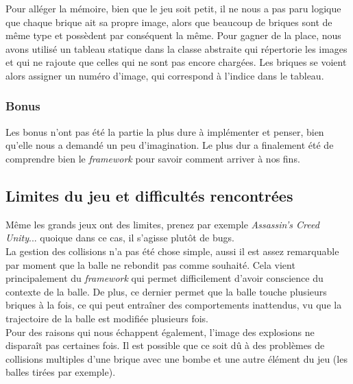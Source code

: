 \documentclass[a4paper,10pt]{article}
\begin{document}
        Pour alléger la mémoire, bien que le jeu soit petit, il ne nous a pas paru logique que chaque brique ait
        sa propre image, alors que beaucoup de briques sont de même type et possèdent par conséquent la même.
        Pour gagner de la place, nous avons utilisé un tableau
        statique dans la classe abstraite qui répertorie les images et qui ne rajoute que celles qui ne sont pas
        encore chargées. Les briques se voient alors assigner un numéro d'image, qui correspond à l'indice dans le
        tableau.

    \subsubsection{Bonus}
        Les bonus n'ont pas été la partie la plus dure à implémenter et penser, bien qu'elle nous a demandé un peu
        d'imagination. Le plus dur a finalement été de comprendre bien le \textit{framework} pour savoir
        comment arriver à nos fins.


\subsection{Limites du jeu et difficultés rencontrées}


Même les grands jeux ont des limites, prenez par exemple \textit{Assassin's Creed Unity}... quoique dans ce cas,
il s'agisse plutôt de bugs. \\

La gestion des collisions n'a pas été chose simple, aussi il est assez remarquable par moment que la balle
ne rebondit pas comme souhaité. Cela vient principalement du \textit{framework} qui permet difficilement d'avoir
conscience du contexte de la balle. De plus, ce dernier permet que la balle touche plusieurs briques à la fois,
ce qui peut entraîner des comportements inattendus, vu que la trajectoire de la balle est modifiée plusieurs fois. \\


Pour des raisons qui nous échappent également, l'image des explosions ne disparaît pas certaines fois. Il est possible
que ce soit dû à des problèmes de collisions multiples d'une brique avec une bombe et une autre élément du jeu (les
balles tirées par exemple).
\end{document}
